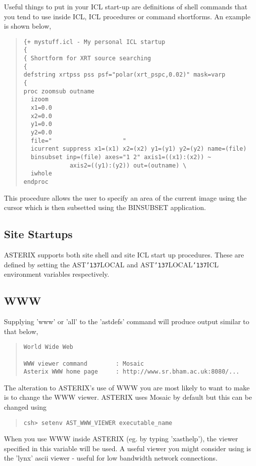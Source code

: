 \documentclass{book}
\renewcommand{\_}{{\tt\char'137}}     %
\begin{document}
Useful things to put in your ICL start-up are definitions of shell
commands that you tend to use inside ICL, ICL procedures or command
shortforms. An example is shown below,
 
\begin{quote}\begin{verbatim}
{+ mystuff.icl - My personal ICL startup
{
{ Shortform for XRT source searching
{
defstring xrtpss pss psf="polar(xrt_pspc,0.02)" mask=varp
{
proc zoomsub outname
  izoom
  x1=0.0
  x2=0.0
  y1=0.0
  y2=0.0
  file="                    "
  icurrent suppress x1=(x1) x2=(x2) y1=(y1) y2=(y2) name=(file)
  binsubset inp=(file) axes="1 2" axis1=((x1):(x2)) ~
             axis2=((y1):(y2)) out=(outname) \
  iwhole
endproc
\end{verbatim}\end{quote}
This procedure allows the user to specify an area of the current
image using the cursor which is then subsetted using the BINSUBSET
application.
 
\subsection{Site Startups}
ASTERIX supports both site shell and site ICL start up procedures.
These are defined by setting the AST\_LOCAL and AST\_LOCAL\_ICL
environment variables respectively.
 
\subsection{WWW}
Supplying 'www' or 'all' to the 'astdefs' command will produce output
similar to that below,
 
\begin{quote}\begin{verbatim}
World Wide Web
 
WWW viewer command        : Mosaic
Asterix WWW home page     : http://www.sr.bham.ac.uk:8080/...
\end{verbatim}\end{quote}
The alteration to ASTERIX's use of WWW you are most likely to want
to make is to change the WWW viewer. ASTERIX uses Mosaic by default
but this can be changed using
\begin{quote}\begin{verbatim}
csh> setenv AST_WWW_VIEWER executable_name
\end{verbatim}\end{quote}
When you use WWW inside ASTERIX (eg. by typing 'xasthelp'), the
viewer specified in this variable will be used. A useful viewer
you might consider using is the 'lynx' ascii viewer - useful for
low bandwidth network connections.
 
\end{document}
